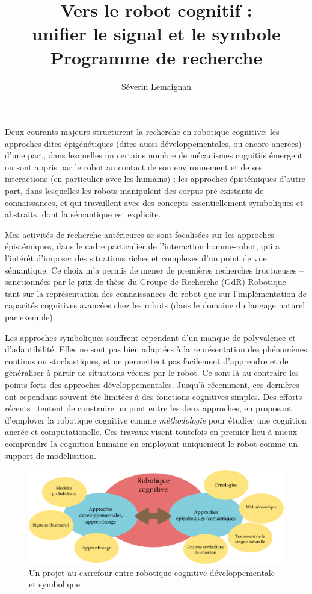 \documentclass[a4paper]{article}
\title{Vers le robot cognitif :\\ unifier le signal et le symbole\\ 
    {\large Programme de recherche}}
\author{Séverin Lemaignan}
\date{}
\begin{document}
\maketitle

Deux courants majeurs structurent la recherche en robotique cognitive: les
approches dites épigénétiques (dites aussi développementales, ou encore ancrées) d'une
part, dans lesquelles un certains nombre de mécanismes cognitifs émergent ou
sont appris par le robot au contact de son environnement et de ses interactions
(en particulier avec les humains) ; les approches épistémiques d'autre part,
dans lesquelles les robots manipulent des corpus pré-existants de connaissances,
et qui travaillent avec des concepts essentiellement symboliques et abstraits,
dont la sémantique est explicite.

Mes activités de recherche antérieures se sont focalisées sur les approches
épistémiques, dans le cadre particulier de l'interaction homme-robot, qui a
l'intérêt d'imposer des situations riches et complexes d'un point de vue
sémantique. Ce choix m'a permis de mener de premières recherches fructueuses --
sanctionnées par le prix de thèse du Groupe de Recherche (GdR) Robotique -- tant
sur la représentation des connaissances du robot que sur l'implémentation de
capacités cognitives avancées chez les robots (dans le domaine du langage
naturel par exemple). 

Les approches symboliques souffrent cependant d'un manque de polyvalence et
d'adaptibilité. Elles ne sont pas bien adaptées à la représentation des
phénomènes continus ou stochastiques, et ne permettent pas facilement
d'apprendre et de généraliser à partir de situations vécues par le robot. Ce
sont là au contraire les points forts des approches développementales.  Jusqu'à
récemment, ces dernières ont cependant souvent été limitées à des fonctions
cognitives simples. Des efforts récents~\cite{morse2010epigenetic,
pezzulo2012computational} tentent de construire un pont entre les deux
approches, en proposant d'employer la robotique cognitive comme
\emph{méthodologie} pour étudier une cognition ancrée et computationelle. Ces
travaux visent toutefois en premier lieu à mieux comprendre la cognition
\underline{humaine} en employant uniquement le robot comme un support de
modélisation.

\begin{figure}
    \centering
    \includegraphics[width=1.0\linewidth]{place}
    \caption{Un projet au carrefour entre robotique cognitive développementale
    et symbolique.}
    \label{place}
\end{figure}
\end{document}
